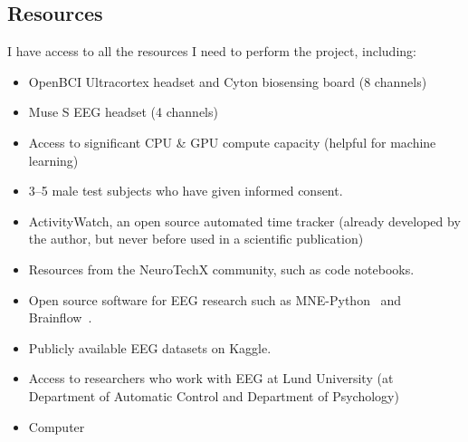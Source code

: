 \documentclass{IEEEtran}
\begin{document}
\begin{refsection}
\section{Resources}

I have access to all the resources I need to perform the project, including:

\begin{itemize}
  \item OpenBCI Ultracortex headset and Cyton biosensing board (8 channels)
  \item Muse S EEG headset (4 channels)
  \item Access to significant CPU \& GPU compute capacity (helpful for machine learning)
  \item 3--5 male test subjects who have given informed consent.
  \item ActivityWatch, an open source automated time tracker (already developed by the author, but never before used in a scientific publication)
  \item Resources from the NeuroTechX community, such as code notebooks.\cite{noauthor_neurotechxeeg-notebooks_2020}
  \item Open source software for EEG research such as MNE-Python~\cite{noauthor_mne-toolsmne-python_2020} and Brainflow~\cite{noauthor_brainflow-devbrainflow_2020}.
  \item Publicly available EEG datasets on Kaggle.\cite{noauthor_search_nodate}
  \item Access to researchers who work with EEG at Lund University (at Department of Automatic Control and Department of Psychology)
  \item Computer
\end{itemize}

\printbibliography[category=cited]

\nocite{*}
  {\list{}
     {\setlength{\leftmargin}{\bibhang}%
      \setlength{\itemindent}{-\leftmargin}%
      \setlength{\itemsep}{\bibitemsep}%
      \setlength{\parsep}{\bibparsep}}
  }
  {\endlist}
  {\item}
\printbibliography[notcategory=cited, env=bibnonum, heading=notcited]

\end{refsection}
\end{document}
